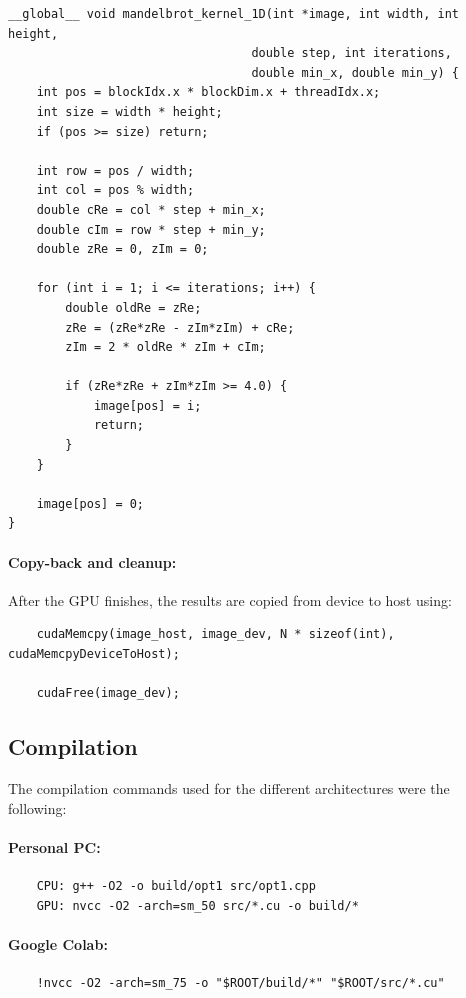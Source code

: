 \begin{lstlisting}[basicstyle=\ttfamily\scriptsize]
__global__ void mandelbrot_kernel_1D(int *image, int width, int height,
                                  double step, int iterations,
                                  double min_x, double min_y) {
    int pos = blockIdx.x * blockDim.x + threadIdx.x;
    int size = width * height;
    if (pos >= size) return;

    int row = pos / width;
    int col = pos % width;
    double cRe = col * step + min_x;
    double cIm = row * step + min_y;
    double zRe = 0, zIm = 0;

    for (int i = 1; i <= iterations; i++) {
        double oldRe = zRe;
        zRe = (zRe*zRe - zIm*zIm) + cRe;
        zIm = 2 * oldRe * zIm + cIm;

        if (zRe*zRe + zIm*zIm >= 4.0) {
            image[pos] = i;
            return;
        }
    }

    image[pos] = 0;
}
\end{lstlisting}

\paragraph{Copy-back and cleanup:} After the GPU finishes, the results are copied from device to host using:
\begin{lstlisting}
    cudaMemcpy(image_host, image_dev, N * sizeof(int), cudaMemcpyDeviceToHost);

    cudaFree(image_dev);
\end{lstlisting}

\subsection{Compilation}

The compilation commands used for the different architectures were the following:

\paragraph{Personal PC:}
\begin{verbatim}
    CPU: g++ -O2 -o build/opt1 src/opt1.cpp
    GPU: nvcc -O2 -arch=sm_50 src/*.cu -o build/*
\end{verbatim}
\paragraph{Google Colab:}
\begin{verbatim}
    !nvcc -O2 -arch=sm_75 -o "$ROOT/build/*" "$ROOT/src/*.cu"
\end{verbatim}

